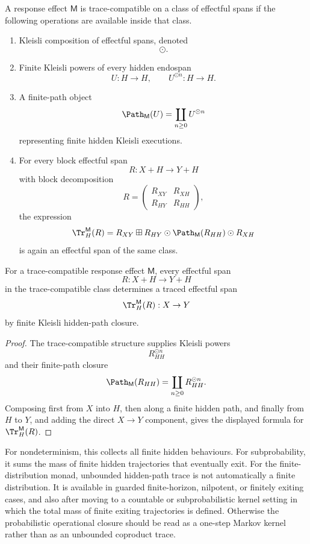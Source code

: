 \begin{definition}
\label{def:trace-compatible-response-effect}
A response effect \(\mathsf M\) is trace-compatible on a class of effectful spans if the following
operations are available inside that class.

\begin{enumerate}
\item Kleisli composition of effectful spans, denoted
\[
\odot .
\]

\item Finite Kleisli powers of every hidden endospan
\[
U:H\to H,
\qquad
U^{\odot n}:H\to H.
\]

\item A finite-path object
\[
\Path_{\mathsf M}(U)
=
\coprod_{n\geq 0}U^{\odot n}
\]
representing finite hidden Kleisli executions.

\item For every block effectful span
\[
R:X+H\to Y+H
\]
with block decomposition
\[
R=
\begin{pmatrix}
R_{XY} & R_{XH}\\
R_{HY} & R_{HH}
\end{pmatrix},
\]
the expression
\[
\Tr_H^{\mathsf M}(R)
=
R_{XY}
\boxplus
R_{HY}\odot
\Path_{\mathsf M}(R_{HH})
\odot
R_{XH}
\]
is again an effectful span of the same class.
\end{enumerate}
\end{definition}

\begin{proposition}
\label{prop:effectful-hidden-path-trace}
For a trace-compatible response effect \(\mathsf M\), every effectful span
\[
R:X+H\to Y+H
\]
in the trace-compatible class determines a traced effectful span
\[
\Tr_H^{\mathsf M}(R):X\to Y
\]
by finite Kleisli hidden-path closure.
\end{proposition}

\begin{proof}
The trace-compatible structure supplies Kleisli powers
\[
R_{HH}^{\odot n}
\]
and their finite-path closure
\[
\Path_{\mathsf M}(R_{HH})=\coprod_{n\geq 0}R_{HH}^{\odot n}.
\]
Composing first from \(X\) into \(H\), then along a finite hidden path, and finally from \(H\) to
\(Y\), and adding the direct \(X\to Y\) component, gives the displayed formula for
\(\Tr_H^{\mathsf M}(R)\).
\end{proof}

For nondeterminism, this collects all finite hidden behaviours.  For subprobability, it sums the
mass of finite hidden trajectories that eventually exit.  For the finite-distribution monad,
unbounded hidden-path trace is not automatically a finite distribution.  It is available in guarded
finite-horizon, nilpotent, or finitely exiting cases, and also after moving to a countable or
subprobabilistic kernel setting in which the total mass of finite exiting trajectories is defined.
Otherwise the probabilistic operational closure should be read as a one-step Markov kernel rather
than as an unbounded coproduct trace.


